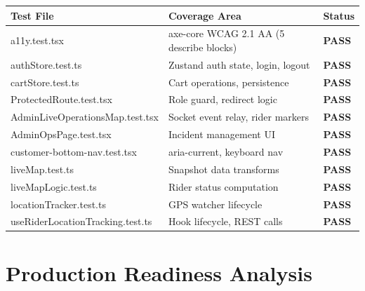 \documentclass[11pt,a4paper]{article}
\newcommand{\PASS}{\colorbox{successgreen!20}{\color{successgreen}\bfseries\small PASS}}
\begin{document}
\begin{tabularx}{\textwidth}{@{}lXl@{}}
\toprule
\rowcolor{navyblue}\color{white}\bfseries Test File & \color{white}\bfseries Coverage Area & \color{white}\bfseries Status \\
\midrule
a11y.test.tsx              & axe-core WCAG 2.1 AA (5 describe blocks) & \PASS \\
\rowcolor{rowalt}
authStore.test.ts          & Zustand auth state, login, logout        & \PASS \\
cartStore.test.ts          & Cart operations, persistence             & \PASS \\
\rowcolor{rowalt}
ProtectedRoute.test.tsx    & Role guard, redirect logic               & \PASS \\
AdminLiveOperationsMap.test.tsx & Socket event relay, rider markers  & \PASS \\
\rowcolor{rowalt}
AdminOpsPage.test.tsx      & Incident management UI                   & \PASS \\
customer-bottom-nav.test.tsx & aria-current, keyboard nav             & \PASS \\
\rowcolor{rowalt}
liveMap.test.ts            & Snapshot data transforms                 & \PASS \\
liveMapLogic.test.ts       & Rider status computation                 & \PASS \\
\rowcolor{rowalt}
locationTracker.test.ts    & GPS watcher lifecycle                    & \PASS \\
useRiderLocationTracking.test.ts & Hook lifecycle, REST calls         & \PASS \\
\bottomrule
\end{tabularx}

\section{Production Readiness Analysis}
\end{document}
